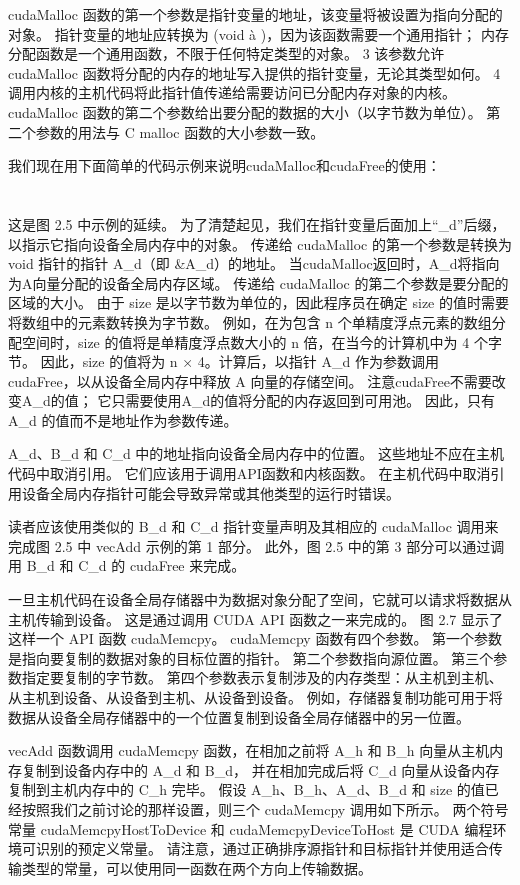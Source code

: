 cudaMalloc 函数的第一个参数是指针变量的地址，该变量将被设置为指向分配的对象。 
指针变量的地址应转换为 (void à )，因为该函数需要一个通用指针； 内存分配函数是一个通用函数，不限于任何特定类型的对象。 
3 该参数允许 cudaMalloc 函数将分配的内存的地址写入提供的指针变量，无论其类型如何。 
4 调用内核的主机代码将此指针值传递给需要访问已分配内存对象的内核。 
cudaMalloc 函数的第二个参数给出要分配的数据的大小（以字节数为单位）。 
第二个参数的用法与 C malloc 函数的大小参数一致。

我们现在用下面简单的代码示例来说明cudaMalloc和cudaFree的使用：
\\
\\
\\
这是图 2.5 中示例的延续。 为了清楚起见，我们在指针变量后面加上“\_d”后缀，以指示它指向设备全局内存中的对象。 
传递给 cudaMalloc 的第一个参数是转换为 void 指针的指针 A\_d（即 \&A\_d）的地址。 
当cudaMalloc返回时，A\_d将指向为A向量分配的设备全局内存区域。 传递给 cudaMalloc 的第二个参数是要分配的区域的大小。 
由于 size 是以字节数为单位的，因此程序员在确定 size 的值时需要将数组中的元素数转换为字节数。 
例如，在为包含 n 个单精度浮点元素的数组分配空间时，size 的值将是单精度浮点数大小的 n 倍，在当今的计算机中为 4 个字节。 
因此，size 的值将为 n × 4。计算后，以指针 A\_d 作为参数调用 cudaFree，以从设备全局内存中释放 A 向量的存储空间。 
注意cudaFree不需要改变A\_d的值； 它只需要使用A\_d的值将分配的内存返回到可用池。 
因此，只有 A\_d 的值而不是地址作为参数传递。

A\_d、B\_d 和 C\_d 中的地址指向设备全局内存中的位置。 这些地址不应在主机代码中取消引用。 
它们应该用于调用API函数和内核函数。 在主机代码中取消引用设备全局内存指针可能会导致异常或其他类型的运行时错误。

读者应该使用类似的 B\_d 和 C\_d 指针变量声明及其相应的 cudaMalloc 调用来完成图 2.5 中 vecAdd 示例的第 1 部分。 
此外，图 2.5 中的第 3 部分可以通过调用 B\_d 和 C\_d 的 cudaFree 来完成。

一旦主机代码在设备全局存储器中为数据对象分配了空间，它就可以请求将数据从主机传输到设备。 
这是通过调用 CUDA API 函数之一来完成的。 图 2.7 显示了这样一个 API 函数 cudaMemcpy。 
cudaMemcpy 函数有四个参数。 第一个参数是指向要复制的数据对象的目标位置的指针。 第二个参数指向源位置。 
第三个参数指定要复制的字节数。 第四个参数表示复制涉及的内存类型：从主机到主机、从主机到设备、从设备到主机、从设备到设备。 
例如，存储器复制功能可用于将数据从设备全局存储器中的一个位置复制到设备全局存储器中的另一位置。

vecAdd 函数调用 cudaMemcpy 函数，在相加之前将 A\_h 和 B\_h 向量从主机内存复制到设备内存中的 A\_d 和 B\_d，
并在相加完成后将 C\_d 向量从设备内存复制到主机内存中的 C\_h 完毕。 
假设 A\_h、B\_h、A\_d、B\_d 和 size 的值已经按照我们之前讨论的那样设置，则三个 cudaMemcpy 调用如下所示。 
两个符号常量 cudaMemcpyHostToDevice 和 cudaMemcpyDeviceToHost 是 CUDA 编程环境可识别的预定义常量。 
请注意，通过正确排序源指针和目标指针并使用适合传输类型的常量，可以使用同一函数在两个方向上传输数据。
\\
\\
\\

